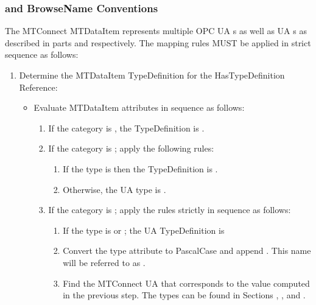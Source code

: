\subsubsection{  and \gls{BrowseName} Conventions}
\label{sec:data-item-conventions}

The MTConnect \gls{MTDataItem} represents multiple OPC UA s as well as UA s as described in parts \cite{UAPart8} and \cite{UAPart9} respectively. The mapping rules MUST be applied in strict sequence as follows:

\begin{enumerate}
  \item Determine the \gls{MTDataItem} \gls{TypeDefinition} for the \gls{HasTypeDefinition} \gls{Reference}:
  \begin{itemize}
    \item Evaluate \gls{MTDataItem} attributes in sequence as follows:
    \begin{enumerate}
      \setlength\itemsep{1em}
      \item If the \gls{category} is , the \gls{TypeDefinition} is .
      
      \item If the \gls{category} is ; apply the following rules:
      \begin{enumerate}
        \item If the \gls{type} is  then the \gls{TypeDefinition} is .
        \item Otherwise, the UA type is .
      \end{enumerate}
      
      \item If the \gls{category} is ; apply the rules strictly in sequence as follows:
      \begin{enumerate}
        \setlength\itemsep{1em}
        \item If the \gls{type} is  or ; the UA \gls{TypeDefinition} is 
        
        \item Convert the \gls{type} attribute to \gls{PascalCase} and append . This name will be referred to as .
        
        \item Find the MTConnect UA  that corresponds to the value computed in the previous step.
        The types can be found in Sections , , and .
        

\end{enumerate}
\end{enumerate}
\end{itemize}
\end{enumerate}

